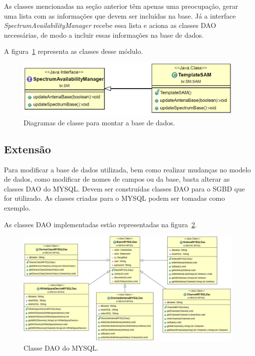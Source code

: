 As classes mencionadas na seção anterior têm apenas uma preocupação, gerar uma lista com as informações que devem ser incluídas na base. Já a interface \textit{SpectrumAvailabilityManager} recebe essa lista e aciona as classes DAO necessárias, de modo a incluir essas informações na base de dados.

A figura~\ref{fig:sm} representa as classes desse módulo.

\begin{figure}[htb]
\centering
\includegraphics[width=1.0\textwidth]{figs/sm}
\caption[Diagrama de classes para montar a base de dados.]
{Diagramas de classe para montar a base de dados.}
\label{fig:sm}
\end{figure}


\subsection{Extensão}

Para modificar a base de dados utilizada, bem como realizar mudanças no modelo de dados, como modificar de nomes de campos ou da base, basta alterar as classes DAO do MYSQL. Devem ser construídas classes DAO para o SGBD que for utilizado. As classes criadas para o MYSQL podem ser tomadas como exemplo.

As classes DAO implementadas estão representadas na figura~\ref{fig:mysqldao}.

\begin{figure}[htb]
\centering
\includegraphics[width=1.0\textwidth]{figs/mysqldao}
\caption[Diagrama de classes DAO do MYSQL.]
{Classe DAO do MYSQL.}
\label{fig:mysqldao}
\end{figure}

